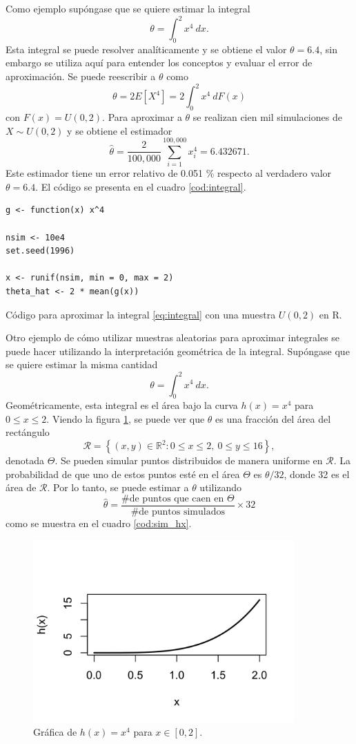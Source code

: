 \documentclass[11pt,a4paper]{article}
\begin{document}
Como ejemplo supóngase que se quiere estimar la integral
\begin{equation}\label{eq:integral}
\theta = \int_0^2 x^4 \ dx.
\end{equation}
Esta integral se puede resolver analíticamente y se obtiene el valor $\theta = 6.4$, sin embargo se utiliza aquí para entender los conceptos y evaluar el error de aproximación. Se puede reescribir a $\theta$ como $$\theta = 2E[X^4] =  2\int_0^2 x^4 \ dF(x)$$ con $F(x) = U(0,2).$ Para aproximar a $\theta$ se realizan cien mil simulaciones de $X\sim U(0,2)$ y se obtiene el estimador $$\hat{\theta} = \frac{2}{100,000}\sum_{i=1}^{100,000} x_i^4 = 6.432671.$$ Este estimador tiene un error relativo de 0.051 \% respecto al verdadero valor $\theta = 6.4$. El código se presenta en el cuadro \ref{cod:integral}.

\begin{table}[htb]
\begin{lstlisting}
g <- function(x) x^4

nsim <- 10e4
set.seed(1996)

x <- runif(nsim, min = 0, max = 2)
theta_hat <- 2 * mean(g(x))
\end{lstlisting}
\caption{Código para aproximar la integral \eqref{eq:integral} con una muestra $U(0, 2)$ en R.}
\label{cod:integral}
\end{table}

Otro ejemplo de cómo utilizar muestras aleatorias para aproximar integrales se puede hacer utilizando la interpretación geométrica de la integral. Supóngase que se quiere estimar la misma cantidad $$\theta = \int_0^2 x^4 \ dx.$$ Geométricamente, esta integral es el área bajo la curva $h(x) = x^4$ para $0 \leq x \leq 2$. Viendo la figura \ref{fig:hx}, se puede ver que $\theta$ es una fracción del área del rectángulo $$\mathcal{R} = \left\lbrace (x, y) \in \mathbb{R}^2: 0\leq x \leq 2, \ 0 \leq y \leq 16\right\rbrace,$$ denotada $\Theta$. Se pueden simular puntos distribuidos de manera uniforme en $\mathcal{R}$. La probabilidad de que uno de estos puntos esté en el área $\Theta$ es $\theta / 32$, donde 32 es el área de $\mathcal{R}.$ Por lo tanto, se puede estimar a $\theta$ utilizando $$\hat{\theta} = \frac{\text{\# de puntos que caen en }\Theta}{\text{\# de puntos simulados}} \times 32$$ como se muestra en el cuadro \ref{cod:sim_hx}.

\begin{figure}[!htb]
\centering\includegraphics[width=10cm]{hx.png}
\caption{Gráfica de $h(x) = x^4$ para $x\in [0,2]$.}
\label{fig:hx}
\end{figure}
\end{document}
